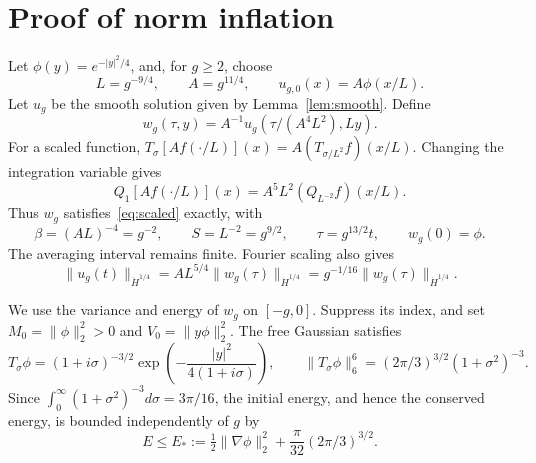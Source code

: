 \documentclass[11pt]{article}
\numberwithin{equation}{section}
\begin{document}
\section{Proof of norm inflation}\label{sec:proof}

Let $\phi(y)=e^{-|y|^2/4}$, and, for $g\ge2$, choose
\begin{equation}\label{eq:parameters}
 L=g^{-9/4},\qquad A=g^{11/4},\qquad u_{g,0}(x)=A\phi(x/L).
\end{equation}
Let $u_g$ be the smooth solution given by Lemma~\ref{lem:smooth}. Define
\[
 w_g(\tau,y)=A^{-1}u_g(\tau/(A^4L^2),Ly).
\]
For a scaled function, $T_\sigma[A f(\cdot/L)](x)=A(T_{\sigma/L^2}f)(x/L)$.
Changing the integration variable gives
\[
 Q_1[A f(\cdot/L)](x)=A^5L^2(Q_{L^{-2}}f)(x/L).
\]
Thus $w_g$ satisfies~\eqref{eq:scaled} exactly, with
\begin{equation}\label{eq:scales}
 \beta=(AL)^{-4}=g^{-2},\qquad S=L^{-2}=g^{9/2},
 \qquad \tau=g^{13/2}t,\qquad w_g(0)=\phi.
\end{equation}
The averaging interval remains finite. Fourier scaling also gives
\begin{equation}\label{eq:normscale}
 \|u_g(t)\|_{\dot H^{1/4}}
 =AL^{5/4}\|w_g(\tau)\|_{\dot H^{1/4}}
 =g^{-1/16}\|w_g(\tau)\|_{\dot H^{1/4}}.
\end{equation}

We use the variance and energy of $w_g$ on $[-g,0]$. Suppress its index, and set
$M_0=\|\phi\|_2^2>0$ and $V_0=\|y\phi\|_2^2$. The free Gaussian satisfies
\[
 T_\sigma\phi=(1+i\sigma)^{-3/2}
    \exp\left(-\frac{|y|^2}{4(1+i\sigma)}\right),
 \qquad
 \|T_\sigma\phi\|_6^6=(2\pi/3)^{3/2}(1+\sigma^2)^{-3}.
\]
Since $\int_0^\infty(1+\sigma^2)^{-3}d\sigma=3\pi/16$, the initial energy,
and hence the conserved energy, is bounded independently of $g$ by
\begin{equation}\label{eq:Estar}
 E\le E_*:=\tfrac12\|\nabla\phi\|_2^2+\frac{\pi}{32}(2\pi/3)^{3/2}.
\end{equation}
\end{document}
